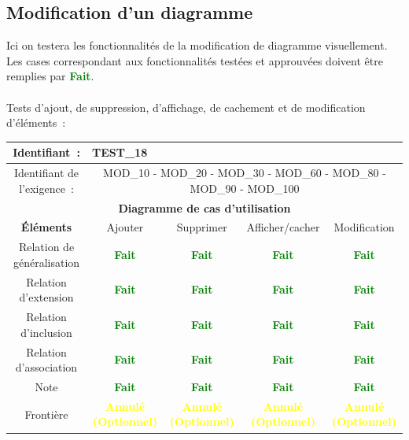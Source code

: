 \documentclass[hidelinks, a4paper,11pt,twoside,final]{article}
\begin{document}
    \subsection*{Modification d’un diagramme}
    Ici on testera les fonctionnalités de la modification de diagramme visuellement.
    Les cases correspondant aux fonctionnalités testées et approuvées doivent être remplies par \textcolor{green}{\textbf{Fait}}.\\
    \\
    Tests d’ajout, de suppression, d’affichage, de cachement et de modification d’éléments~:\\
    \begin{tabular}{|c|c|c|c|c|}\hline
    {Identifiant~:} & \multicolumn{4}{|l|}{TEST\_18} \\\hline
    {Identifiant de l’exigence~:} & \multicolumn{4}{|p{10cm}|}{MOD\_10 - MOD\_20 - MOD\_30 - MOD\_60 - MOD\_80 - MOD\_90 - MOD\_100} \\\hline
    \multicolumn{5}{|c|}{\textbf{Diagramme de cas d’utilisation}} \\\hline
    {\textbf{Éléments}} & {Ajouter} & {Supprimer} & {Afficher/cacher} & {Modification} \\\hline
    {Relation de généralisation} & {\textcolor{green}{\textbf{Fait}}} & {\textcolor{green}{\textbf{Fait}}} & {\textcolor{green}{\textbf{Fait}}} & {\textcolor{green}{\textbf{Fait}}}\\\hline
    {Relation d’extension} & {\textcolor{green}{\textbf{Fait}}} & {\textcolor{green}{\textbf{Fait}}} & {\textcolor{green}{\textbf{Fait}}} & {\textcolor{green}{\textbf{Fait}}}\\\hline
    {Relation d’inclusion} & {\textcolor{green}{\textbf{Fait}}} & {\textcolor{green}{\textbf{Fait}}} & {\textcolor{green}{\textbf{Fait}}} & {\textcolor{green}{\textbf{Fait}}}\\\hline
    {Relation d’association} & {\textcolor{green}{\textbf{Fait}}} & {\textcolor{green}{\textbf{Fait}}} & {\textcolor{green}{\textbf{Fait}}} & {\textcolor{green}{\textbf{Fait}}}\\\hline
    {Note} & {\textcolor{green}{\textbf{Fait}}} & {\textcolor{green}{\textbf{Fait}}} & {\textcolor{green}{\textbf{Fait}}} & {\textcolor{green}{\textbf{Fait}}}\\\hline
    {Frontière} & {\textcolor{yellow}{\textbf{Annulé (Optionnel)}}} & {\textcolor{yellow}{\textbf{Annulé (Optionnel)}}} & {\textcolor{yellow}{\textbf{Annulé (Optionnel)}}} & {\textcolor{yellow}{\textbf{Annulé (Optionnel)}}}\\\hline

\end{tabular}
\end{document}
